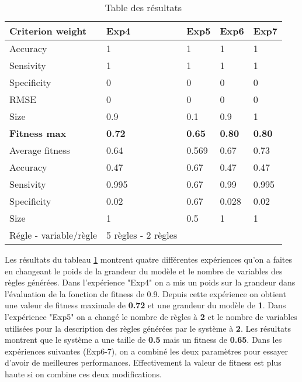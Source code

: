 \begin{table}[h]
  \centering
  \begin{tabular}{|l|l|l|l|l|}
  \hline
  \textbf{Criterion weight} & \textbf{Exp4} & \textbf{Exp5} & \textbf{Exp6} & \textbf{Exp7} \\ \hline
  Accuracy                 & 1             & 1             & 1             & 1             \\ \hline
  Sensivity                & 1             & 1             & 1             & 1             \\ \hline
  Specificity              & 0             & 0             & 0             & 0             \\ \hline
  RMSE                     & 0             & 0             & 0             & 0             \\ \hline
  Size                     & 0.9           & 0.1           & 0.9           & 1             \\ \hline
  \textbf{Fitness max}     & \textbf{0.72} & \textbf{0.65} & \textbf{0.80} & \textbf{0.80} \\ \hline
  Average fitness          & 0.64          & 0.569         & 0.67          & 0.73          \\ \hline
  Accuracy                 & 0.47          & 0.67          & 0.47          & 0.47          \\ \hline
  Sensivity                & 0.995         & 0.67          & 0.99          & 0.995         \\ \hline
  Specificity              & 0.02          & 0.67          & 0.028         & 0.02          \\ \hline
  Size                     & 1             & 0.5           & 1             & 1             \\ \hline
  Régle - variable/règle  & 5 règles - 2 règles      &        &               &               \\ \hline
  \end{tabular}
  \caption{\label{table4}Table des résultats}
\end{table}

Les résultats du tableau \ref{table4} montrent quatre différentes expériences qu’on a faites en changeant le poids de la grandeur du modèle et le nombre de variables des règles générées. Dans l'expérience "Exp4" on a mis un poids sur la grandeur dans l'évaluation de la fonction de fitness de 0.9. Depuis cette expérience on obtient une valeur de fitness maximale de \textbf{0.72} et une grandeur du modèle de \textbf{1}. Dans l'expérience "Exp5" on a changé le nombre de règles à \textbf{2} et le nombre de variables utilisées pour la description des règles générées par le système à \textbf{2}. Les résultats montrent que le système a une taille de \textbf{0.5} mais un fitness de \textbf{0.65}.
Dans les expériences suivantes (Exp6-7), on a combiné les deux paramètres pour essayer d'avoir de meilleures performances. Effectivement la valeur de fitness est plus haute si on combine ces deux modifications.


